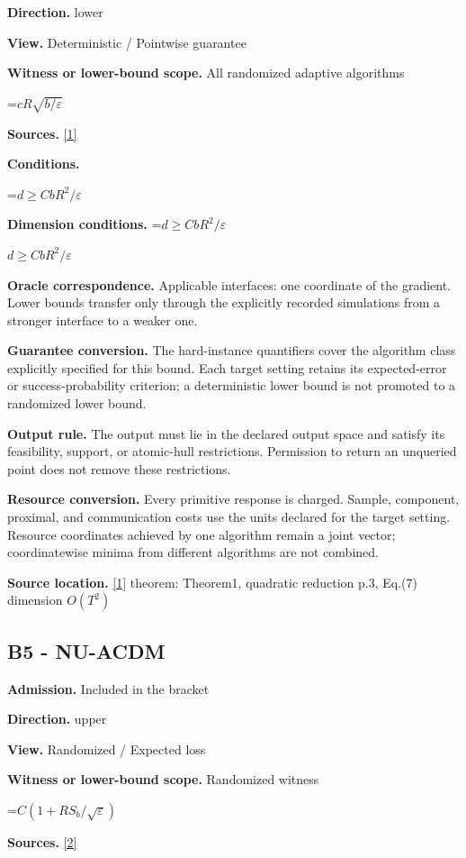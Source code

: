 \documentclass[10pt,a4paper]{article}
\newcommand{\AtlasMath}[1]{\par\begingroup\centering\setbox0=\hbox{$\displaystyle #1$}\ifdim\wd0>1.4\linewidth\typeout{ATLAS WIDE FORMULA: \the\wd0}\fi\ifdim\wd0>\linewidth\resizebox{\linewidth}{!}{\box0}\else\box0\fi\par\endgroup}
\newcommand{\AtlasInlineMath}[1]{\begingroup\setbox0=\hbox{$#1$}\ifdim\wd0>.4\linewidth\endgroup\AtlasMath{#1}\else\endgroup$#1$\fi}
\begin{document}
\textbf{Direction.} lower

\textbf{View.} Deterministic / Pointwise guarantee

\textbf{Witness or lower-bound scope.} All randomized adaptive algorithms

\AtlasMath{cR\sqrt{b/\varepsilon}}
\textbf{Sources.} \href{https://arxiv.org/pdf/2609.10874}{[1]}

\textbf{Conditions.} 
\AtlasMath{d\ge CbR^2/\varepsilon}


\textbf{Dimension conditions.} \AtlasInlineMath{d\ge CbR^2/\varepsilon}

\textbf{Oracle correspondence.} Applicable interfaces: one coordinate of the gradient. Lower bounds transfer only through the explicitly recorded simulations from a stronger interface to a weaker one.

\textbf{Guarantee conversion.} The hard-instance quantifiers cover the algorithm class explicitly specified for this bound. Each target setting retains its expected-error or success-probability criterion; a deterministic lower bound is not promoted to a randomized lower bound.

\textbf{Output rule.} The output must lie in the declared output space and satisfy its feasibility, support, or atomic-hull restrictions. Permission to return an unqueried point does not remove these restrictions.

\textbf{Resource conversion.} Every primitive response is charged. Sample, component, proximal, and communication costs use the units declared for the target setting. Resource coordinates achieved by one algorithm remain a joint vector; coordinatewise minima from different algorithms are not combined.

\textbf{Source location.} \href{https://arxiv.org/pdf/2609.10874}{[1]} theorem: Theorem1, quadratic reduction p.3, Eq.(7) dimension $O(T^2)$

\subsection{B5 - NU-ACDM}
\textbf{Admission.} Included in the bracket

\textbf{Direction.} upper

\textbf{View.} Randomized / Expected loss

\textbf{Witness or lower-bound scope.} Randomized witness

\AtlasMath{C(1+RS_b/\sqrt\varepsilon)}
\textbf{Sources.} \href{https://arxiv.org/pdf/1512.09103}{[2]}
\end{document}
